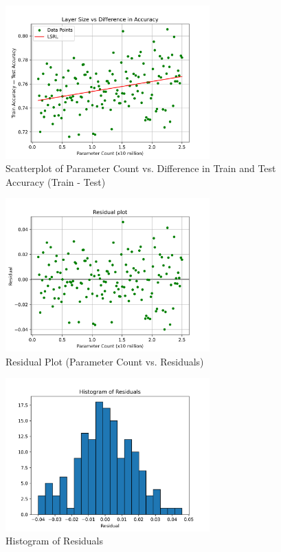 \documentclass[12pt]{article}
\begin{document}
    \begin{figure}[H]
        \centering
        \includegraphics[width=0.7\textwidth]{Images/Scatter}
        \caption{Scatterplot of Parameter Count vs. Difference in Train and Test Accuracy (Train - Test)}
        \label{fig:scatterplot}
    \end{figure}

    \begin{figure}[H]
        \centering
        \includegraphics[width=0.7\textwidth]{Images/Resid}
        \caption{Residual Plot (Parameter Count vs. Residuals)}
        \label{fig:residuals}
    \end{figure}

    \begin{figure}[H]
        \centering
        \includegraphics[width=0.7\textwidth]{Images/Resid Hist}
        \caption{Histogram of Residuals}
        \label{fig:residual_hist}
    \end{figure}
\end{document}

